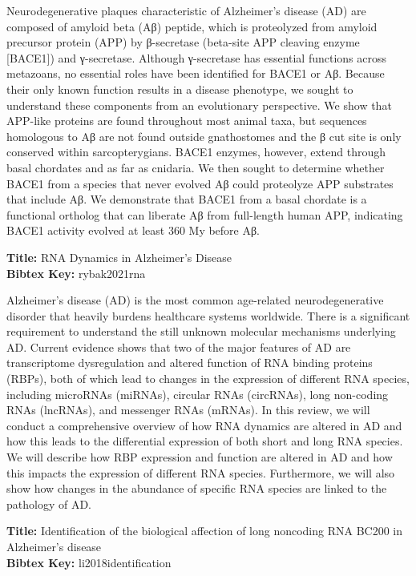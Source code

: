 \documentclass[11pt]{article}
\begin{document}
Neurodegenerative plaques characteristic of Alzheimer’s disease (AD) are composed of amyloid beta (Aβ) peptide, which is proteolyzed from amyloid precursor protein (APP) by β-secretase (beta-site APP cleaving enzyme [BACE1]) and γ-secretase. 
Although γ-secretase has essential functions across metazoans, no essential roles have been identified for BACE1 or Aβ. Because their only known function results in a disease phenotype, we sought to understand these components from an evolutionary perspective. 
We show that APP-like proteins are found throughout most animal taxa, but sequences homologous to Aβ are not found outside gnathostomes and the β cut site is only conserved within sarcopterygians. 
BACE1 enzymes, however, extend through basal chordates and as far as cnidaria. 
We then sought to determine whether BACE1 from a species that never evolved Aβ could proteolyze APP substrates that include Aβ. 
We demonstrate that BACE1 from a basal chordate is a functional ortholog that can liberate Aβ from full-length human APP, indicating BACE1 activity evolved at least 360 My before Aβ.

\textbf{Title: }RNA Dynamics in Alzheimer’s Disease\\
\textbf{Bibtex Key: }rybak2021rna\\
\cite{rybak2021rna}

Alzheimer’s disease (AD) is the most common age-related neurodegenerative disorder that heavily burdens healthcare systems worldwide. 
There is a significant requirement to understand the still unknown molecular mechanisms underlying AD. 
Current evidence shows that two of the major features of AD are transcriptome dysregulation and altered function of RNA binding proteins (RBPs), both of which lead to changes in the expression of different RNA species, including microRNAs (miRNAs), circular RNAs (circRNAs), long non-coding RNAs (lncRNAs), and messenger RNAs (mRNAs). 
In this review, we will conduct a comprehensive overview of how RNA dynamics are altered in AD and how this leads to the differential expression of both short and long RNA species. 
We will describe how RBP expression and function are altered in AD and how this impacts the expression of different RNA species. 
Furthermore, we will also show how changes in the abundance of specific RNA species are linked to the pathology of AD.

\textbf{Title: }Identification of the biological affection of long noncoding RNA BC200 in Alzheimer’s disease\\
\textbf{Bibtex Key: }li2018identification\\
\cite{li2018identification}
\end{document}
